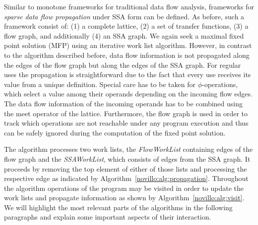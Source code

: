Similar to monotone frameworks for traditional data flow analysis, frameworks
for \emph{sparse data flow propagation} under SSA form can be defined. As
before, such a framework consist of: (1) a complete lattice, (2) a set of
transfer functions, (3) a flow graph, and additionally (4) an SSA graph. We
again seek a maximal fixed point solution (MFP) using an iterative work list
algorithm. However, in contrast to the algorithm described before, data flow
information is not propagated along the edges of the flow graph but along the
edges of the SSA graph. For regular uses the propagation is straightforward due
to the fact that every use receives its value from a unique definition. Special
care has to be taken for $\phi$-operations, which select a value among their
operands depending on the incoming flow edges. The data flow information of the
incoming operands has to be combined using the meet operator of the lattice.
Furthermore, the flow graph is used in order to track which operations are not
reachable under any program execution and thus can be safely ignored during the
computation of the fixed point solution.

The algorithm processes two work lists, the \emph{FlowWorkList} containing edges
of the flow graph and the \emph{SSAWorkList}, which consists of edges from the
SSA graph. It proceeds by removing the top element of either of those lists and
processing the respective edge as indicated by
Algorithm~\ref{novillo:alg:propagation}. Throughout the algorithm operations of
the program may be visited in order to update the work lists and propagate
information as shown by Algorithm~\ref{novillo:alg:visit}. We will highlight
the most relevant parts of the algorithms in the following paragraphs and
explain some important aspects of their interaction.

